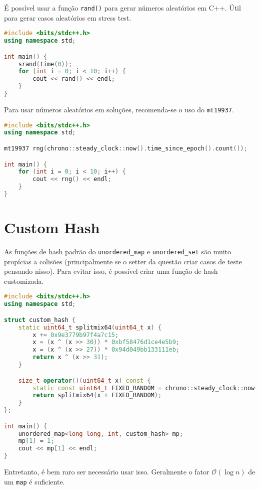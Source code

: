 É possível usar a função \texttt{rand()} para gerar números aleatórios em C++.
Útil para gerar casos aleatórios em stress test.

\begin{lstlisting}[language=C++]
#include <bits/stdc++.h>
using namespace std;

int main() {
    srand(time(0));
    for (int i = 0; i < 10; i++) {
        cout << rand() << endl;
    }
}

\end{lstlisting}

Para usar números aleatórios em soluções, recomenda-se o uso do \texttt{mt19937}.

\begin{lstlisting}[language=C++]
#include <bits/stdc++.h>
using namespace std;

mt19937 rng(chrono::steady_clock::now().time_since_epoch().count());

int main() {
    for (int i = 0; i < 10; i++) {
        cout << rng() << endl;
    }
}

\end{lstlisting}

\section{Custom Hash}

As funções de hash padrão do \texttt{unordered\_map} e \texttt{unordered\_set} são muito propícias a colisões (principalmente se o setter da questão criar casos de teste pensando nisso).
Para evitar isso, é possível criar uma função de hash customizada.

\begin{lstlisting}[language=C++]
#include <bits/stdc++.h>
using namespace std;

struct custom_hash {
    static uint64_t splitmix64(uint64_t x) {
        x += 0x9e3779b97f4a7c15;
        x = (x ^ (x >> 30)) * 0xbf58476d1ce4e5b9;
        x = (x ^ (x >> 27)) * 0x94d049bb133111eb;
        return x ^ (x >> 31);
    }

    size_t operator()(uint64_t x) const {
        static const uint64_t FIXED_RANDOM = chrono::steady_clock::now().time_since_epoch().count();
        return splitmix64(x + FIXED_RANDOM);
    }
};

int main() {
    unordered_map<long long, int, custom_hash> mp;
    mp[1] = 1;
    cout << mp[1] << endl;
}
\end{lstlisting}

Entretanto, é bem raro ser necessário usar isso. Geralmente o fator $\mathcal{O}(\log n)$ de um \texttt{map} é suficiente.